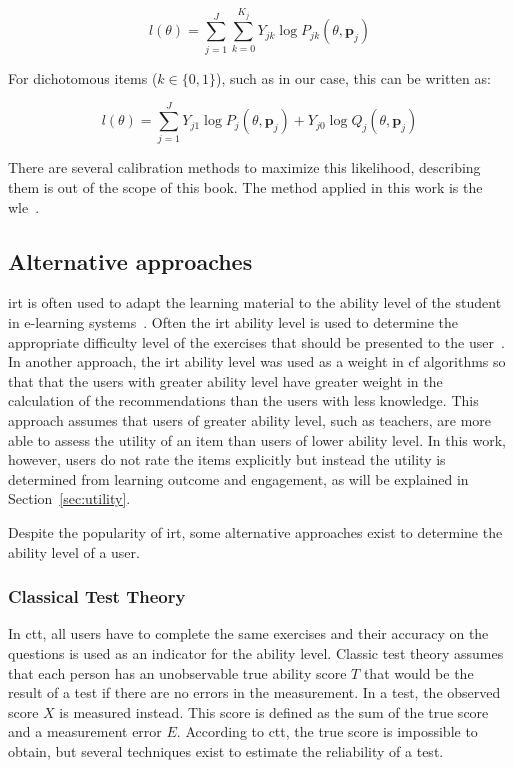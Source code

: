 \begin{equation}
    \label{eq:wle2}
    l(\theta) = \sum_{j=1}^{J} \sum_{k=0}^{K_j} Y_{jk}\log P_{jk}(\theta, \bm{p}_j)
\end{equation}

For dichotomous items ($k \in \{0,1\}$), such as in our case, this can be written as:

\begin{equation}
    \label{eq:wle3}
    l(\theta) = \sum_{j=1}^{J} Y_{j1} \log P_{j}(\theta, \bm{p}_j) + Y_{j0} \log Q_{j}(\theta, \bm{p}_j)
\end{equation}

There are several calibration methods to maximize this likelihood, describing them is out of the scope of this book. 
The method applied in this work is the \gls{wle}~\cite{magis2017computerized}.

\subsection{Alternative approaches}
\gls{irt} is often used to adapt the learning material to the ability level of the student in e-learning systems~\cite{chen2005personalized,yarandi2011personalised}.
Often the \gls{irt} ability level is used to determine the appropriate difficulty level of the exercises that should be presented to the user~\cite{chen2005personalized,yarandi2011personalised,khanal2020systematic}.
In another approach, the \gls{irt} ability level was used as a weight in \gls{cf} algorithms so that that the users with greater ability level have greater weight in the calculation of the recommendations than the users with less knowledge.
This approach assumes that users of greater ability level, such as teachers, are more able to assess the utility of an item than users of lower ability level.
In this work, however, users do not rate the items explicitly but instead the utility is determined from learning outcome and engagement, as will be explained in Section~\ref{sec:utility}.

Despite the popularity of \gls{irt}, some alternative approaches exist to determine the ability level of a user.

\subsubsection{Classical Test Theory}
In \gls{ctt}, all users have to complete the same exercises and their accuracy on the questions is used as an indicator for the ability level.
Classic test theory assumes that each person has an unobservable true ability score $T$ that would be the result of a test if there are no errors in the measurement.
In a test, the observed score $X$ is measured instead.
This score is defined as the sum of the true score and a measurement error $E$.
According to \gls{ctt}, the true score is impossible to obtain, but several techniques exist to estimate the reliability of a test.

